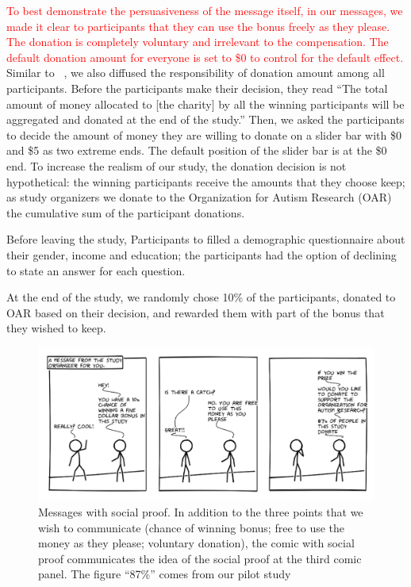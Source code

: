 \textcolor{red}{To best demonstrate the persuasiveness of the message itself, in our messages, we made it clear to participants that they can use the bonus freely as they please. The donation is completely voluntary and irrelevant to the compensation. The default donation amount for everyone is set to \$0 to control for the default effect.} Similar to ~\textcite{lee2013does}, we also diffused the responsibility of donation amount among all participants. Before the participants make their decision, they read ``The total amount of money allocated to [the charity] by all the winning participants will be aggregated and donated at the end of the study.'' Then, we asked the participants to decide the amount of money they are willing to donate on a slider bar with \$0 and \$5 as two extreme ends. The default position of the slider bar is at the \$0 end. To increase the realism of our study, the donation decision is not hypothetical: the winning participants receive the amounts that they choose keep; as study organizers we donate to the Organization for Autism Research (OAR) the cumulative sum of the participant donations. 

Before leaving the study, Participants to filled a demographic questionnaire about their gender, income and education; the participants had the option of declining to state an answer for each question.

At the end of the study, we randomly chose 10\% of the participants, donated to OAR based on their decision, and rewarded them with part of the bonus that they wished to keep.




\begin{figure}[bt]
    \centering
    \includegraphics[width=\columnwidth]{./figures/social_proof.png}
    \caption{Messages with social proof. In addition to the three points that we wish to communicate (chance of winning bonus; free to use the money as they please; voluntary donation), the comic with social proof communicates the idea of the social proof at the third comic panel. The figure ``87\%'' comes from our pilot study}
    \label{fig:basic three comic social proof}
\end{figure}



